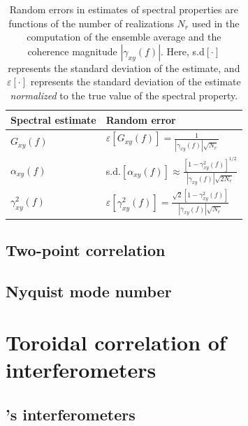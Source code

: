 \begin{table}[t]
  \centering
  \renewcommand{\arraystretch}{1.5}%
  \begin{tabular}{%
    >{\centering}m{5.0cm} >{\centering}m{5.0cm}
  }
    \toprule%
    \textbf{Spectral estimate}
    & \textbf{Random error} \cite{bendat_and_piersol}
    \tabularnewline%
    \midrule
    $G_{xy}(f)$
    & $\varepsilon \left[G_{xy}(f) \right]
    =
    \frac{1}{|\gamma_{xy}(f)| \sqrt{N_r}}$
    \tabularnewline%
    $\alpha_{xy}(f)$
    & s.d.$\left[ \alpha_{xy}(f) \right]
    \approx
    \frac{[1 - \gamma_{xy}^2(f)]^{1/2}}{|\gamma_{xy}(f)| \sqrt{2 N_r}}$
    \tabularnewline%
    $\gamma_{xy}^2(f)$
    & $\varepsilon \left[ \gamma_{xy}^2(f) \right]
    =
    \frac{\sqrt{2} [1 - \gamma_{xy}^2(f)]}{|\gamma_{xy}(f)| \sqrt{N_r}}$
    \tabularnewline%
    \toprule%
  \end{tabular}
  \caption[Random errors in spectral estimates]{%
    Random errors in estimates of spectral properties are functions of
    the number of realizations $N_r$ used
    in the computation of the ensemble average and
    the coherence magnitude $|\gamma_{xy}(f)|$.
    Here, s.d$[\cdot]$ represents the standard deviation of the estimate, and
    $\varepsilon[\cdot]$ represents the standard deviation of the estimate
    \emph{normalized} to the true value of the spectral property.
    }%
\label{table:ToroidalCorrelation:spectral_estimate_random_errors}
\end{table}

\subsection{Two-point correlation}

\subsection{Nyquist mode number}


\section{Toroidal correlation of interferometers}
\label{sec:ToroidalCorrelation:interferometer_measurements}


\subsection{\diiid's interferometers}



